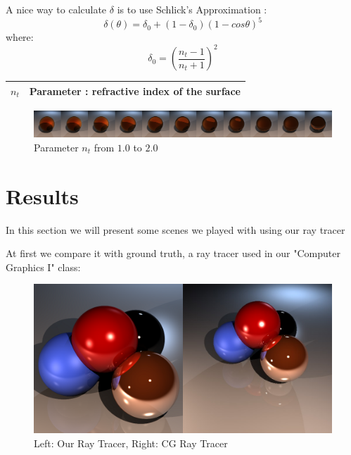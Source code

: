 \documentclass[11pt,a4paper]{article}
\begin{document}
A nice way to calculate $\delta$ is to use Schlick's Approximation \cite{Sch94}:
\begin{equation}
\delta(\theta) = \delta_0 + (1-\delta_0)(1-cos\theta)^5
\end{equation}
where:
\begin{equation}
\delta_0 = \left(\frac{n_t-1}{n_t+1}\right)^2
\end{equation}

\begin{table}[H]
\begin{tabular}{| c | l |}
\hline
$n_t$ & Parameter : refractive index of the surface\\ \hline
\end{tabular}
\end{table}


\begin{figure}[H]
\caption{Parameter $n_t$ from $1.0$ to $2.0$}
\includegraphics[width=\textwidth]{glasscomplete.png}
\end{figure}

\newpage
\section{Results}
In this section we will present some scenes we played with using our ray tracer

At first we compare it with ground truth, a ray tracer used in our "Computer Graphics I" class:
\begin{figure}[H]
\includegraphics[width=\textwidth]{cgcomparison.png}

\caption{Left: Our Ray Tracer, Right: CG Ray Tracer}
\end{figure}
\end{document}
